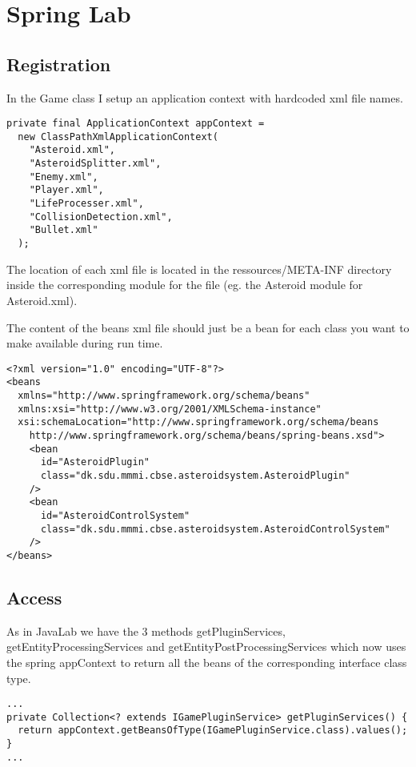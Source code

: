 \section{Spring Lab}

\subsection{Registration}
In the Game class I setup an application context with hardcoded xml file names.
\begin{verbatim}
private final ApplicationContext appContext =
  new ClassPathXmlApplicationContext(
    "Asteroid.xml",
    "AsteroidSplitter.xml", 
    "Enemy.xml",
    "Player.xml",
    "LifeProcesser.xml",
    "CollisionDetection.xml",
    "Bullet.xml"
  );
\end{verbatim}

The location of each xml file is located in the ressources/META-INF directory
inside the corresponding module for the file (eg. the Asteroid module for
Asteroid.xml).

The content of the beans xml file should just be a bean for each class you want
to make available during run time.

\begin{verbatim}
<?xml version="1.0" encoding="UTF-8"?>
<beans
  xmlns="http://www.springframework.org/schema/beans"
  xmlns:xsi="http://www.w3.org/2001/XMLSchema-instance"
  xsi:schemaLocation="http://www.springframework.org/schema/beans 
    http://www.springframework.org/schema/beans/spring-beans.xsd">
    <bean 
      id="AsteroidPlugin"
      class="dk.sdu.mmmi.cbse.asteroidsystem.AsteroidPlugin"
    />
    <bean
      id="AsteroidControlSystem"
      class="dk.sdu.mmmi.cbse.asteroidsystem.AsteroidControlSystem"
    />
</beans>
\end{verbatim}

\subsection{Access}
As in JavaLab we have the 3 methods getPluginServices,
getEntityProcessingServices and getEntityPostProcessingServices which now uses
the spring appContext to return all the beans of the corresponding interface
class type.

\begin{verbatim}
...
private Collection<? extends IGamePluginService> getPluginServices() {
  return appContext.getBeansOfType(IGamePluginService.class).values();
}
...
\end{verbatim}


